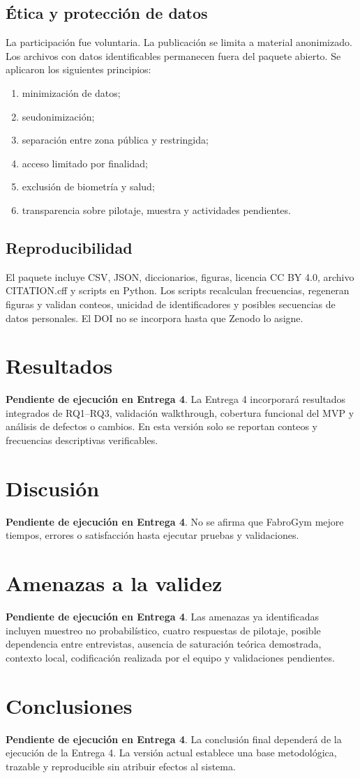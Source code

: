 \documentclass[11pt,a4paper]{article}
\newcommand{\pending}{\textcolor{red!70!black}{\textbf{Pendiente de ejecución en Entrega 4}}}
\begin{document}
\subsection{Ética y protección de datos}

La participación fue voluntaria. La publicación se limita a material anonimizado. Los archivos con datos identificables permanecen fuera del paquete abierto. Se aplicaron los siguientes principios:
\begin{enumerate}
\item minimización de datos;
\item seudonimización;
\item separación entre zona pública y restringida;
\item acceso limitado por finalidad;
\item exclusión de biometría y salud;
\item transparencia sobre pilotaje, muestra y actividades pendientes.
\end{enumerate}

\subsection{Reproducibilidad}

El paquete incluye CSV, JSON, diccionarios, figuras, licencia CC BY 4.0, archivo CITATION.cff y scripts en Python. Los scripts recalculan frecuencias, regeneran figuras y validan conteos, unicidad de identificadores y posibles secuencias de datos personales. El DOI no se incorpora hasta que Zenodo lo asigne.

\section{Resultados}
\pending. La Entrega 4 incorporará resultados integrados de RQ1--RQ3, validación walkthrough, cobertura funcional del MVP y análisis de defectos o cambios. En esta versión solo se reportan conteos y frecuencias descriptivas verificables.

\section{Discusión}
\pending. No se afirma que FabroGym mejore tiempos, errores o satisfacción hasta ejecutar pruebas y validaciones.

\section{Amenazas a la validez}
\pending. Las amenazas ya identificadas incluyen muestreo no probabilístico, cuatro respuestas de pilotaje, posible dependencia entre entrevistas, ausencia de saturación teórica demostrada, contexto local, codificación realizada por el equipo y validaciones pendientes.

\section{Conclusiones}
\pending. La conclusión final dependerá de la ejecución de la Entrega 4. La versión actual establece una base metodológica, trazable y reproducible sin atribuir efectos al sistema.



\end{document}
